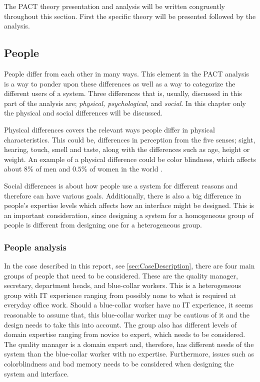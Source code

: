 The PACT theory presentation and analysis will be written congruently throughout this section.
First the specific theory will be presented followed by the analysis.

\subsection{People}\label{sec:PACT-people}
People differ from each other in many ways.
This element in the PACT analysis is a way to ponder upon these differences as well as a way to categorize the different users of a system.
Three differences that is, usually, discussed in this part of the analysis are; \textit{physical, psychological}, and \textit{social}.
In this chapter only the physical and social differences will be discussed.

Physical differences covers the relevant ways people differ in physical characteristics.
This could be, differences in perception from the five senses; sight, hearing, touch, smell and taste, along with the differences such as age, height or weight.
An example of a physical difference could be color blindness, which affects about $8\%$ of men and $0.5\%$ of women in the world \cite{ColourBlind}.

Social differences is about how people use a system for different reasons and therefore can have various goals.
Additionally, there is also a big difference in people's expertise levels which affects how an interface might be designed.
This is an important consideration, since designing a system for a homogeneous group of people is  different from designing one for a heterogeneous group. \cite{Benyon}

\subsubsection*{People analysis}
In the case described in this report, see \cref{sec:CaseDescription}, there are four main groups of people that need to be considered.
These are the quality manager, secretary, department heads, and blue-collar workers.
This is a heterogeneous group with IT experience ranging from possibly none to what is required at everyday office work.
Should a blue-collar worker have no IT experience, it seems reasonable to assume that, this blue-collar worker may be cautious of it and the design needs to take this into account.
The group also has different levels of domain expertise ranging from novice to expert, which needs to be considered.
The quality manager is a domain expert and, therefore, has different needs of the system than the blue-collar worker with no expertise.
Furthermore, issues such as colorblindness and bad memory needs to be considered when designing the system and interface.

